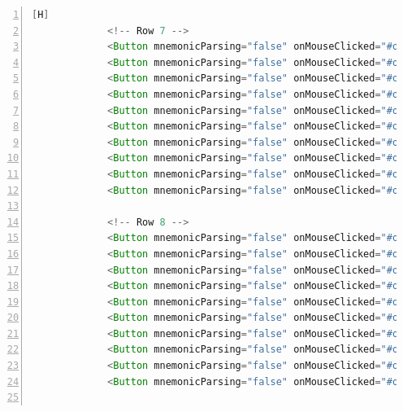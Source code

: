 \documentclass{article}
\begin{document}
\begin{lstlisting}[language=java,caption={Archivo FXML}, numbers=left][H]
             <!-- Row 7 -->
             <Button mnemonicParsing="false" onMouseClicked="#onButtonClick" styleClass="button" text="" GridPane.columnIndex="0" GridPane.rowIndex="7" />
             <Button mnemonicParsing="false" onMouseClicked="#onButtonClick" styleClass="button" text="" GridPane.columnIndex="1" GridPane.rowIndex="7" />
             <Button mnemonicParsing="false" onMouseClicked="#onButtonClick" styleClass="button" text="" GridPane.columnIndex="2" GridPane.rowIndex="7" />
             <Button mnemonicParsing="false" onMouseClicked="#onButtonClick" styleClass="button" text="" GridPane.columnIndex="3" GridPane.rowIndex="7" />
             <Button mnemonicParsing="false" onMouseClicked="#onButtonClick" styleClass="button" text="" GridPane.columnIndex="4" GridPane.rowIndex="7" />
             <Button mnemonicParsing="false" onMouseClicked="#onButtonClick" styleClass="button" text="" GridPane.columnIndex="5" GridPane.rowIndex="7" />
             <Button mnemonicParsing="false" onMouseClicked="#onButtonClick" styleClass="button" text="" GridPane.columnIndex="6" GridPane.rowIndex="7" />
             <Button mnemonicParsing="false" onMouseClicked="#onButtonClick" styleClass="button" text="" GridPane.columnIndex="7" GridPane.rowIndex="7" />
             <Button mnemonicParsing="false" onMouseClicked="#onButtonClick" styleClass="button" text="" GridPane.columnIndex="8" GridPane.rowIndex="7" />
             <Button mnemonicParsing="false" onMouseClicked="#onButtonClick" styleClass="button" text="" GridPane.columnIndex="9" GridPane.rowIndex="7" />

             <!-- Row 8 -->
             <Button mnemonicParsing="false" onMouseClicked="#onButtonClick" styleClass="button" text="" GridPane.columnIndex="0" GridPane.rowIndex="8" />
             <Button mnemonicParsing="false" onMouseClicked="#onButtonClick" styleClass="button" text="" GridPane.columnIndex="1" GridPane.rowIndex="8" />
             <Button mnemonicParsing="false" onMouseClicked="#onButtonClick" styleClass="button" text="" GridPane.columnIndex="2" GridPane.rowIndex="8" />
             <Button mnemonicParsing="false" onMouseClicked="#onButtonClick" styleClass="button" text="" GridPane.columnIndex="3" GridPane.rowIndex="8" />
             <Button mnemonicParsing="false" onMouseClicked="#onButtonClick" styleClass="button" text="" GridPane.columnIndex="4" GridPane.rowIndex="8" />
             <Button mnemonicParsing="false" onMouseClicked="#onButtonClick" styleClass="button" text="" GridPane.columnIndex="5" GridPane.rowIndex="8" />
             <Button mnemonicParsing="false" onMouseClicked="#onButtonClick" styleClass="button" text="" GridPane.columnIndex="6" GridPane.rowIndex="8" />
             <Button mnemonicParsing="false" onMouseClicked="#onButtonClick" styleClass="button" text="" GridPane.columnIndex="7" GridPane.rowIndex="8" />
             <Button mnemonicParsing="false" onMouseClicked="#onButtonClick" styleClass="button" text="" GridPane.columnIndex="8" GridPane.rowIndex="8" />
             <Button mnemonicParsing="false" onMouseClicked="#onButtonClick" styleClass="button" text="" GridPane.columnIndex="9" GridPane.rowIndex="8" />


\end{lstlisting}
\end{document}
